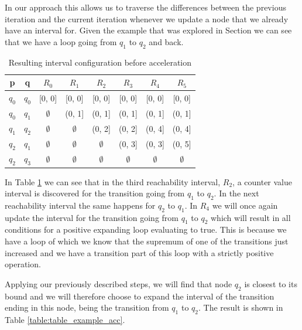 \documentclass[12pt]{article}
\begin{document}
In our approach this allows us to traverse the differences between the previous iteration and the current iteration whenever we update a node that we already have an interval for. Given the example that was explored in Section  we can see that we have a loop going from $q_1$ to $q_2$ and back. 

\begin{table}[h]
	\begin{tabular}{ |c|c|c|c|c|c|c|c| }
		\hline
		p		& q 	& $R_0$ 		& $R_1$			& $R_2$			& $R_3$			& $R_4$ 		& $R_5$ \\
		\hline
		$q_0$	& $q_0$ & [0, 0] 		& [0, 0] 		& [0, 0] 		& [0, 0]		& [0, 0]		& [0, 0] \\
		$q_0$	& $q_1$ & $\emptyset$ 	& (0, 1]		& (0, 1] 		& (0, 1]		& (0, 1] 		& (0, 1] \\
		$q_1$	& $q_2$ & $\emptyset$ 	& $\emptyset$ 	& (0, 2] 		& (0, 2]		& (0, 4] 		& (0, 4] \\
		$q_2$	& $q_1$ & $\emptyset$ 	& $\emptyset$ 	& $\emptyset$	& (0, 3]		& (0, 3] 		& (0, 5] \\
		$q_2$	& $q_3$ & $\emptyset$ 	& $\emptyset$ 	& $\emptyset$	& $\emptyset$	& $\emptyset$	& $\emptyset$ \\
		\hline
	\end{tabular}
	\centering
	\caption{Resulting interval configuration before acceleration}
	\label{table:table_example_no_acc}
\end{table}

In Table \ref{table:table_example_no_acc} we can see that in the third reachability interval, $R_2$, a counter value interval is discovered for the transition going from $q_1$ to $q_2$. In the next reachability interval the same happens for $q_2$ to $q_1$. In $R_4$ we will once again update the interval for the transition going from $q_1$ to $q_2$ which will result in all conditions for a positive expanding loop evaluating to true. This is because we have a loop of which we know that the supremum of one of the transitions just increased and we have a transition part of this loop with a strictly positive operation.

Applying our previously described steps, we will find that node $q_2$ is closest to its bound and we will therefore choose to expand the interval of the transition ending in this node, being the transition from $q_1$ to $q_2$. The result is shown in Table \ref{table:table_example_acc}.
\end{document}
